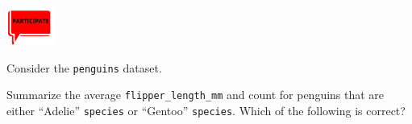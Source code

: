 \documentclass[
  letterpaper,
  DIV=11,
  numbers=noendperiod]{scrreprt}
\begin{document}
\includegraphics[width=\textwidth,height=0.5in]{images/images_lecture/participate_icon.png}

\begin{tcolorbox}[enhanced jigsaw, colframe=quarto-callout-note-color-frame, breakable, colback=white, toprule=.15mm, leftrule=.75mm, left=2mm, opacityback=0, rightrule=.15mm, arc=.35mm, bottomrule=.15mm]

Consider the \texttt{penguins} dataset.

Summarize the average \texttt{flipper\_length\_mm} and count for
penguins that are either ``Adelie'' \texttt{species} or ``Gentoo''
\texttt{species}. Which of the following is correct?


\end{tcolorbox}
\end{document}

